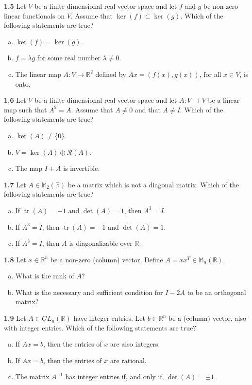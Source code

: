 \documentclass[11pt,a4paper]{article}
\newcommand{\R}{\mathbb{R}}
\newcommand{\M}{\mathbb{M}}
\newcommand{\tr}{\operatorname{tr}}
\newcommand{\qitem}[1]{\par\medskip\noindent\textbf{#1}\hspace{0.5em}}
\begin{document}
\qitem{1.5} Let $V$ be a finite dimensional real vector space and let $f$ and $g$ be non-zero linear functionals on $V$. Assume that $\ker(f) \subset \ker(g)$. Which of the following statements are true?
\begin{enumerate}[a.]
  \item $\ker(f) = \ker(g)$.
  \item $f = \lambda g$ for some real number $\lambda \neq 0$.
  \item The linear map $A : V \to \R^2$ defined by $Ax = (f(x), g(x))$, for all $x \in V$, is onto.
\end{enumerate}

\qitem{1.6} Let $V$ be a finite dimensional real vector space and let $A : V \to V$ be a linear map such that $A^2 = A$. Assume that $A \neq 0$ and that $A \neq I$. Which of the following statements are true?
\begin{enumerate}[a.]
  \item $\ker(A) \neq \{0\}$.
  \item $V = \ker(A) \oplus \mathcal{R}(A)$.
  \item The map $I + A$ is invertible.
\end{enumerate}

\qitem{1.7} Let $A \in \M_2(\R)$ be a matrix which is not a diagonal matrix. Which of the following statements are true?
\begin{enumerate}[a.]
  \item If $\tr(A) = -1$ and $\det(A) = 1$, then $A^3 = I$.
  \item If $A^3 = I$, then $\tr(A) = -1$ and $\det(A) = 1$.
  \item If $A^3 = I$, then $A$ is diagonalizable over $\R$.
\end{enumerate}

\qitem{1.8} Let $x \in \R^n$ be a non-zero (column) vector. Define $A = xx^T \in \M_n(\R)$.
\begin{enumerate}[a.]
  \item What is the rank of $A$?
  \item What is the necessary and sufficient condition for $I - 2A$ to be an orthogonal matrix?
\end{enumerate}

\qitem{1.9} Let $A \in GL_n(\R)$ have integer entries. Let $b \in \R^n$ be a (column) vector, also with integer entries. Which of the following statements are true?
\begin{enumerate}[a.]
  \item If $Ax = b$, then the entries of $x$ are also integers.
  \item If $Ax = b$, then the entries of $x$ are rational.
  \item The matrix $A^{-1}$ has integer entries if, and only if, $\det(A) = \pm 1$.
\end{enumerate}
\end{document}
